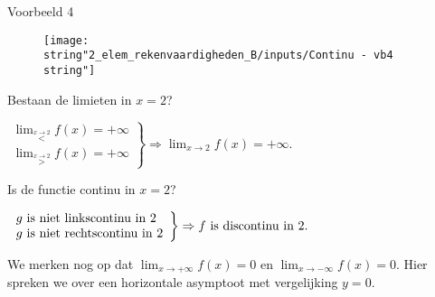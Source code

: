\medskip{}


\noindent Voorbeeld 4

\begin{figure}[h]
	\centering
	\texttt{[image: \\string"2\_elem\_rekenvaardigheden\_B/inputs/Continu - vb4\\string"]}
\end{figure}

Bestaan de limieten in $x=2$?

\begin{math}
\left. \begin{array}{l}
{\displaystyle\lim_{\overset{x\rightarrow2}{<}}}f(x)=+\infty \\
{\displaystyle \lim_{\overset{x\rightarrow2}{>}}}f(x)=+\infty
\end{array}
\right\}
\Rightarrow{\displaystyle \lim_{x\to2}}f(x)=+\infty.
\end{math}

Is de functie continu in $x=2$?

\begin{math}
\centering
\left. \begin{array}{l}
g \text{ is niet linkscontinu in }2\\
g \text{ is niet rechtscontinu in }2
\end{array}
\right\}
\Rightarrow f \text{ is discontinu in }2.
\end{math}

We merken nog op dat ${\displaystyle\lim_{x\rightarrow+\infty}}f(x)=0$ en ${\displaystyle\lim_{x\rightarrow-\infty}}f(x)=0$. Hier spreken we over een horizontale asymptoot met vergelijking $y=0$.


